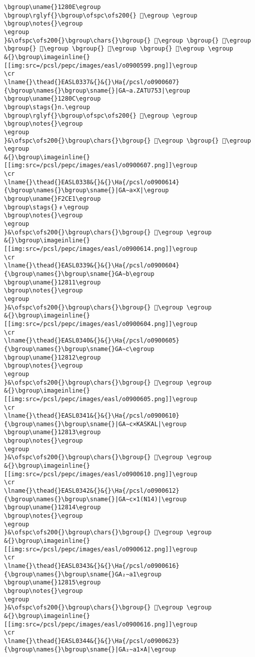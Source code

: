 \begin{verbatim}
\bgroup\uname{}1280E\egroup
\bgroup\rglyf{}\bgroup\ofspc\ofs200{} 𒠎\egroup \egroup
\bgroup\notes{}\egroup
\egroup
}&\ofspc\ofs200{}\bgroup\chars{}\bgroup{} 𒠊\egroup \bgroup{} 𒠋\egroup \bgroup{} 𒠍\egroup \bgroup{} 𒠎\egroup \bgroup{} 𒠏\egroup \egroup
&{}\bgroup\imageinline{}[[img:src=/pcsl/pepc/images/easl/o0900599.png]]\egroup
\cr
\lname{}\thead{}EASL0337&{}&{}\Ha{/pcsl/o0900607}{\bgroup\names{}\bgroup\sname{}|GA∼a.ZATU753|\egroup
\bgroup\uname{}1280C\egroup
\bgroup\stags{}n.\egroup
\bgroup\rglyf{}\bgroup\ofspc\ofs200{} 𒠌\egroup \egroup
\bgroup\notes{}\egroup
\egroup
}&\ofspc\ofs200{}\bgroup\chars{}\bgroup{} 𒠌\egroup \bgroup{} 𒠐\egroup \egroup
&{}\bgroup\imageinline{}[[img:src=/pcsl/pepc/images/easl/o0900607.png]]\egroup
\cr
\lname{}\thead{}EASL0338&{}&{}\Ha{/pcsl/o0900614}{\bgroup\names{}\bgroup\sname{}|GA∼a×X|\egroup
\bgroup\uname{}F2CE1\egroup
\bgroup\stags{}﹟\egroup
\bgroup\notes{}\egroup
\egroup
}&\ofspc\ofs200{}\bgroup\chars{}\bgroup{} 󲳡\egroup \egroup
&{}\bgroup\imageinline{}[[img:src=/pcsl/pepc/images/easl/o0900614.png]]\egroup
\cr
\lname{}\thead{}EASL0339&{}&{}\Ha{/pcsl/o0900604}{\bgroup\names{}\bgroup\sname{}GA∼b\egroup
\bgroup\uname{}12811\egroup
\bgroup\notes{}\egroup
\egroup
}&\ofspc\ofs200{}\bgroup\chars{}\bgroup{} 𒠑\egroup \egroup
&{}\bgroup\imageinline{}[[img:src=/pcsl/pepc/images/easl/o0900604.png]]\egroup
\cr
\lname{}\thead{}EASL0340&{}&{}\Ha{/pcsl/o0900605}{\bgroup\names{}\bgroup\sname{}GA∼c\egroup
\bgroup\uname{}12812\egroup
\bgroup\notes{}\egroup
\egroup
}&\ofspc\ofs200{}\bgroup\chars{}\bgroup{} 𒠒\egroup \egroup
&{}\bgroup\imageinline{}[[img:src=/pcsl/pepc/images/easl/o0900605.png]]\egroup
\cr
\lname{}\thead{}EASL0341&{}&{}\Ha{/pcsl/o0900610}{\bgroup\names{}\bgroup\sname{}|GA∼c×KASKAL|\egroup
\bgroup\uname{}12813\egroup
\bgroup\notes{}\egroup
\egroup
}&\ofspc\ofs200{}\bgroup\chars{}\bgroup{} 𒠓\egroup \egroup
&{}\bgroup\imageinline{}[[img:src=/pcsl/pepc/images/easl/o0900610.png]]\egroup
\cr
\lname{}\thead{}EASL0342&{}&{}\Ha{/pcsl/o0900612}{\bgroup\names{}\bgroup\sname{}|GA∼c×1(N14)|\egroup
\bgroup\uname{}12814\egroup
\bgroup\notes{}\egroup
\egroup
}&\ofspc\ofs200{}\bgroup\chars{}\bgroup{} 𒠔\egroup \egroup
&{}\bgroup\imageinline{}[[img:src=/pcsl/pepc/images/easl/o0900612.png]]\egroup
\cr
\lname{}\thead{}EASL0343&{}&{}\Ha{/pcsl/o0900616}{\bgroup\names{}\bgroup\sname{}GA₂∼a1\egroup
\bgroup\uname{}12815\egroup
\bgroup\notes{}\egroup
\egroup
}&\ofspc\ofs200{}\bgroup\chars{}\bgroup{} 𒠕\egroup \egroup
&{}\bgroup\imageinline{}[[img:src=/pcsl/pepc/images/easl/o0900616.png]]\egroup
\cr
\lname{}\thead{}EASL0344&{}&{}\Ha{/pcsl/o0900623}{\bgroup\names{}\bgroup\sname{}|GA₂∼a1×A|\egroup

\end{verbatim}
